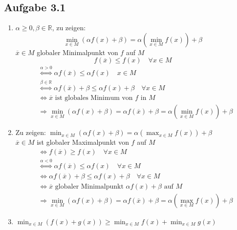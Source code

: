 \documentclass[12pt]{extreport} %
\newcommand{\R}{\mathbb{R}}
\theoremstyle{named}
\theoremstyle{nnamed}
\theoremstyle{itshape}
\theoremstyle{normal}
\begin{document}
\subsection*{Aufgabe 3.1}
\begin{enumerate}
	\item $\alpha \geq 0, \beta \in \R$, zu zeigen: 
		$$ \min_{x \in M} \left( \alpha f(x) + \beta \right) = \alpha \left( \min_{x \in M} f(x) \right) + \beta $$
		$\overline{x} \in M$ globaler Minimalpunkt von $f$ auf $M$
		$$ f(\overline{x}) \leq f(x) \quad \forall x \in M $$
		\begin{align*}
			& \overset{\alpha > 0}{\iff} \alpha f(\overline{x}) \leq \alpha f(x) \quad x \in M \\
			& \overset{\beta \in \R}{\iff} \alpha f(\overline{x}) + \beta \leq \alpha f(x) + \beta \quad \forall x \in M \\
			& \iff \overline{x} \text{ ist globales Minimum von $f$ in $M$} \\
			& \Rightarrow \min_{x \in M} \left( \alpha f(x) + \beta \right) = \alpha f(\overline{x}) + \beta = \alpha \left( \min_{x \in M} f(x) \right) + \beta
		\end{align*}
	\item Zu zeigen: $\min_{x \in M} \left( \alpha f(x) + \beta \right) = \alpha \left( \max_{x \in M} f(x) \right) + \beta$ ~\\
		$\overline{x} \in M$ ist globaler Maximalpunkt von $f$ auf $M$
		\begin{align*}
			& \iff f(\overline{x}) \geq f(x) \quad \forall x \in M \\
			& \overset{\alpha < 0}{\iff} \alpha f(\overline{x}) \leq \alpha f(x) \quad \forall x \in M \\
			& \iff \alpha f(\overline{x}) + \beta \leq \alpha f(x) + \beta \quad \forall x \in M \\
			& \iff \overline{x} \text{ globaler Minimalpunkt } \alpha f(x) + \beta \text{ auf } M \\
			& \Rightarrow \min_{x \in M} \left( \alpha f(x) + \beta \right) = \alpha f(\overline{x}) + \beta = \alpha \left( \max_{ x \in M} f(x) \right) + \beta
		\end{align*}
	\item $\min_{x \in M} \left( f(x) + g(x) \right) \geq \min_{x \in M} f(x) + \min_{x \in M} g(x)$
\end{enumerate}
\end{document}
